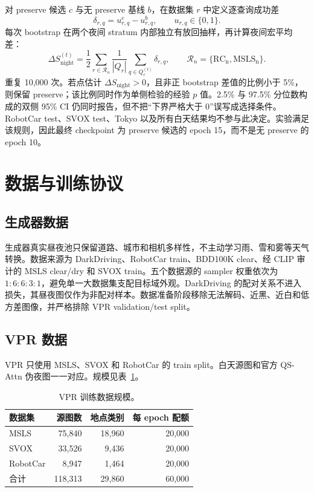 \documentclass[UTF8,a4paper,11pt]{ctexart}
\begin{document}
对 preserve 候选 $c$ 与无 preserve 基线 $b$，在数据集 $r$ 中定义逐查询成功差
\[
 \delta_{r,q}=u^c_{r,q}-u^b_{r,q},\qquad u_{r,q}\in\{0,1\}.
\]
每次 bootstrap 在两个夜间 stratum 内部独立有放回抽样，再计算夜间宏平均差：
\[
 \Delta S_{\mathrm{night}}^{(t)}=\frac12\sum_{r\in\mathcal R_n}
 \frac1{|Q_r|}\sum_{q\in Q_r^{(t)}}\delta_{r,q},\qquad
 \mathcal R_n=\{\mathrm{RC_n,MSLS_n}\}.
\]
重复 10,000 次。若点估计 $\Delta S_{\mathrm{night}}>0$，且非正 bootstrap 差值的比例小于 5\%，则保留 preserve；该比例同时作为单侧检验的经验 $p$ 值。2.5\% 与 97.5\% 分位数构成的双侧 95\% CI 仍同时报告，但不把“下界严格大于 0”误写成选择条件。RobotCar test、SVOX test、Tokyo 以及所有白天结果均不参与此决定。实验满足该规则，因此最终 checkpoint 为 preserve 候选的 epoch 15，而不是无 preserve 的 epoch 10。

\section{数据与训练协议}
\subsection{生成器数据}
生成器真实昼夜池只保留道路、城市和相机多样性，不主动学习雨、雪和雾等天气转换。数据来源为 DarkDriving、RobotCar train、BDD100K clear、经 CLIP 审计的 MSLS clear/dry 和 SVOX train。五个数据源的 sampler 权重依次为 $1:6:6:3:1$，避免单一大数据集支配目标域外观。DarkDriving 的配对关系不进入损失，其昼夜图仅作为非配对样本。数据准备阶段移除无法解码、近黑、近白和低方差图像，并严格排除 VPR validation/test split。

\subsection{VPR 数据}
VPR 只使用 MSLS、SVOX 和 RobotCar 的 train split。白天源图和官方 QS-Attn 伪夜图一一对应。规模见表~\ref{tab:vpr-data}。
\begin{table}[htbp]
\centering
\caption{VPR 训练数据规模。}
\label{tab:vpr-data}
\begin{tabular}{lrrr}
\toprule
数据集 & 源图数 & 地点类别 & 每 epoch 配额\\
\midrule
MSLS & 75,840 & 18,960 & 20,000\\
SVOX & 33,526 & 9,436 & 20,000\\
RobotCar & 8,947 & 1,464 & 20,000\\
\midrule
合计 & 118,313 & 29,860 & 60,000\\
\bottomrule
\end{tabular}
\end{table}
\end{document}
